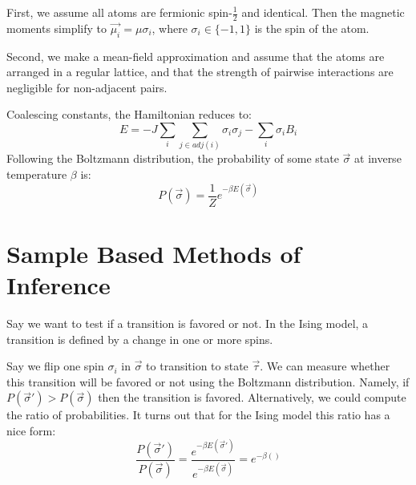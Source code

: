 \documentclass{article}
\begin{document}
First, we assume all atoms are fermionic spin-$\frac{1}{2}$ and identical. 
Then the magnetic moments simplify to $\vec{\mu_i} = \mu \sigma_i$, where 
$\sigma_i \in \{-1, 1\}$ is the spin of the atom. 

Second, we make a mean-field approximation and assume that the atoms are 
arranged in a regular lattice, and that the strength of pairwise interactions 
are negligible for non-adjacent pairs.

Coalescing constants, the Hamiltonian reduces to:
\begin{equation}\label{isingE}
    E = -J\sum_i \sum_{j \in adj(i)} \sigma_i \sigma_j - \sum_i \sigma_i B_i
\end{equation}
Following the Boltzmann distribution, the probability of some state 
$\vec{\sigma}$ at inverse temperature $\beta$ is:
\begin{equation} \label{boltzmann}
    P(\vec{\sigma}) = \frac{1}{Z}e^{-\beta E(\vec{\sigma})} 
\end{equation}

\section{Sample Based Methods of Inference}

Say we want to test if a transition is favored or not. 
In the Ising model, a transition is defined by a change in one or more spins. 

Say we flip one spin $\sigma_i$ in $\vec{\sigma}$ to transition to state 
$\vec{\tau}$. 
We can measure whether this transition will be favored or not using the 
Boltzmann distribution. 
Namely, if $P(\vec{\sigma}') > P(\vec{\sigma})$ then the transition is favored. 
Alternatively, we could compute the ratio of probabilities. 
It turns out that for the Ising model this ratio has a nice form:
\begin{equation}
    \frac{P(\vec{\sigma}')}{P(\vec{\sigma})} = 
    \frac{e^{-\beta E(\vec{\sigma}')}}{e^{-\beta E(\vec{\sigma})}} = 
    e^{-\beta()}
\end{equation}


\newpage



\end{document}
